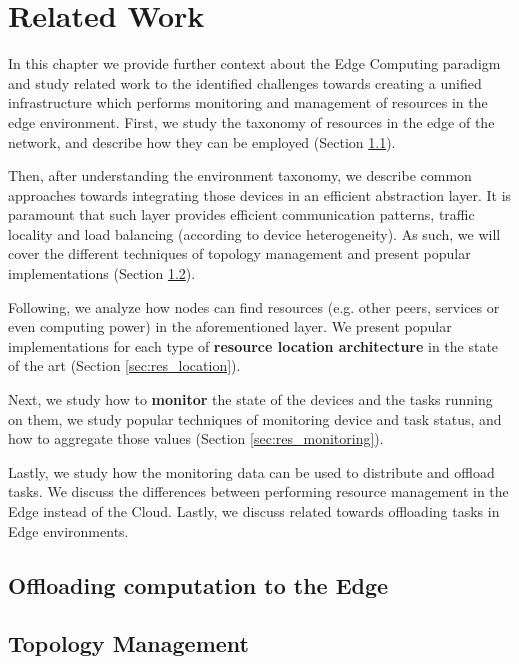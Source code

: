 \chapter{Related Work} \label{cha:related_work}

In this chapter we provide further context about the Edge Computing paradigm and study related work to the identified challenges towards creating a unified infrastructure which performs monitoring and management of resources in the edge environment. First, we study the taxonomy of resources in the edge of the network, and describe how they can be employed (Section \ref{sec:offloading_computation}).

Then, after understanding the environment taxonomy, we describe common approaches towards integrating those devices in an efficient abstraction layer. It is paramount that such layer provides efficient communication patterns, traffic locality and load balancing (according to device heterogeneity). As such, we will cover the different techniques of topology management and present popular implementations (Section \ref{sec:topology_management}).

Following, we analyze how nodes can find resources (e.g. other peers, services or even computing power) in the aforementioned layer. We present popular implementations for each type of \textbf{resource location architecture}  in the state of the art (Section \ref{sec:res_location}). 

Next, we study how to \textbf{monitor} the state of the devices and the tasks running on them, we study popular techniques of monitoring device and task status, and how to aggregate those values (Section \ref{sec:res_monitoring}).

Lastly, we study how the monitoring data can be used to distribute and offload tasks. We discuss the differences between performing resource management in the Edge instead of the Cloud. Lastly, we discuss related towards offloading tasks  in Edge environments.

\section{Offloading computation to the Edge} \label{sec:offloading_computation} 

\section{Topology Management} \label{sec:topology_management} 

